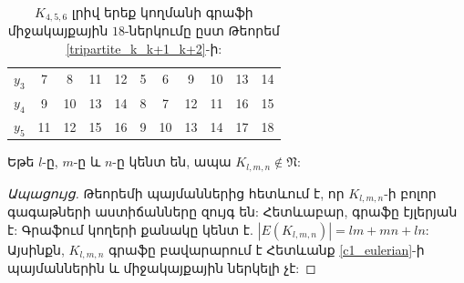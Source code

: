 \begin{hide}
\begin{table}[]
\begin{tabular}{ccccccccccc}
\multicolumn{1}{c|}{$y_3$} & \multicolumn{1}{c|}{7}  & \multicolumn{1}{c|}{8}  & \multicolumn{1}{c|}{11} & \multicolumn{1}{c|}{12} & \multicolumn{1}{c|}{5}   & \multicolumn{1}{c|}{6}   & \multicolumn{1}{c|}{9}   & \multicolumn{1}{c|}{10}  & \multicolumn{1}{c|}{13}   & \multicolumn{1}{c|}{14}   \\ \cline{2-11} 
\multicolumn{1}{c|}{$y_4$} & \multicolumn{1}{c|}{9}  & \multicolumn{1}{c|}{10} & \multicolumn{1}{c|}{13} & \multicolumn{1}{c|}{14} & \multicolumn{1}{c|}{8}   & \multicolumn{1}{c|}{7}   & \multicolumn{1}{c|}{12}  & \multicolumn{1}{c|}{11}  & \multicolumn{1}{c|}{16}   & \multicolumn{1}{c|}{15}   \\ \cline{2-11} 
\multicolumn{1}{c|}{$y_5$} & \multicolumn{1}{c|}{11} & \multicolumn{1}{c|}{12} & \multicolumn{1}{c|}{15} & \multicolumn{1}{c|}{16} & \multicolumn{1}{c|}{9}   & \multicolumn{1}{c|}{10}  & \multicolumn{1}{c|}{13}  & \multicolumn{1}{c|}{14}  & \multicolumn{1}{c|}{17}   & \multicolumn{1}{c|}{18}   \\ \cline{2-11} 
\end{tabular}
\caption{$K_{4,5,6}$ լրիվ երեք կողմանի գրաֆի միջակայքային $18$-ներկումը ըստ Թեորեմ \ref{tripartite_k_k+1_k+2}-ի:}\label{tripartite_4_5_6}

\end{table}
\begin{theorem}
Եթե $l$-ը, $m$-ը և $n$-ը կենտ են, ապա $K_{l,m,n} \notin \mathfrak{N}$:
\end{theorem}
\begin{proof}[Ապացույց]
Թեորեմի պայմաններից հետևում է, որ $K_{l,m,n}$-ի բոլոր գագաթների աստիճանները զույգ են: Հետևաբար, գրաֆը էյլերյան է: Գրաֆում կողերի քանակը կենտ է. $|E(K_{l,m,n})| = lm + mn + ln$: Այսինքն, $K_{l,m,n}$ գրաֆը բավարարում է Հետևանք \ref{c1_eulerian}-ի պայմաններին և միջակայքային ներկելի չէ:
\end{proof}
\end{hide}

